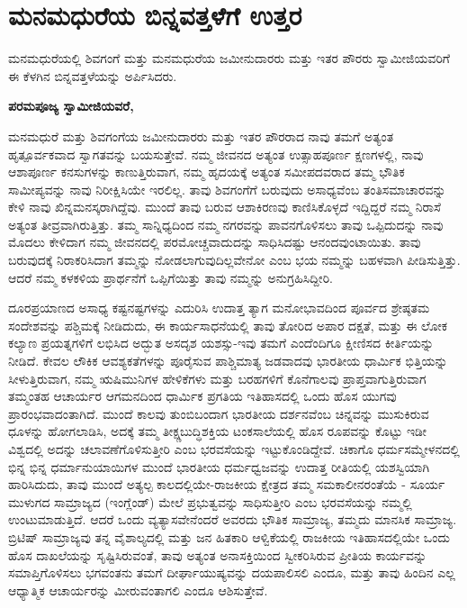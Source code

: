 
\chapter{ಮನಮಧುರೆಯ ಬಿನ್ನವತ್ತಳೆಗೆ ಉತ್ತರ}

ಮನಮಧುರೆಯಲ್ಲಿ ಶಿವಗಂಗೆ ಮತ್ತು ಮನಮಧುರೆಯ ಜಮೀನುದಾರರು ಮತ್ತು ಇತರ ಪೌರರು ಸ್ವಾಮೀಜಿಯವರಿಗೆ ಈ ಕೆಳಗಿನ ಬಿನ್ನವತ್ತಳೆಯನ್ನು ಅರ್ಪಿಸಿ\-ದರು.

\textbf{ಪರಮಪೂಜ್ಯ ಸ್ವಾಮೀಜಿಯವರೆ,}

ಮನಮಧುರೆ ಮತ್ತು ಶಿವಗಂಗೆಯ ಜಮೀನುದಾರರು ಮತ್ತು ಇತರ ಪೌರರಾದ ನಾವು ತಮಗೆ ಅತ್ಯಂತ ಹೃತ್ಪೂರ್ವಕವಾದ ಸ್ವಾಗತವನ್ನು ಬಯಸುತ್ತೇವೆ. ನಮ್ಮ ಜೀವನದ ಅತ್ಯಂತ ಉತ್ಸಾಹಪೂರ್ಣ ಕ್ಷಣಗಳಲ್ಲಿ, ನಾವು ಆಶಾಪೂರ್ಣ ಕನಸುಗಳನ್ನು ಕಾಣುತ್ತಿರುವಾಗ, ನಮ್ಮ ಹೃದಯಕ್ಕೆ ಅತ್ಯಂತ ಸಮೀಪದವರಾದ ತಮ್ಮ ಭೌತಿಕ ಸಾಮೀಪ್ಯವನ್ನು ನಾವು ನಿರೀಕ್ಷಿಸಿಯೇ ಇರಲಿಲ್ಲ. ತಾವು ಶಿವಗಂಗೆಗೆ ಬರುವುದು ಅಸಾಧ್ಯವೆಂಬ ತಂತಿಸಮಾಚಾರವನ್ನು ಕೇಳಿ ನಾವು ಖಿನ್ನಮನಸ್ಕರಾಗಿದ್ದೆವು. ಮುಂದೆ ತಾವು ಬರುವ ಆಶಾಕಿರಣವು ಕಾಣಿಸಿಕೊಳ್ಳದೆ ಇದ್ದಿದ್ದರೆ ನಮ್ಮ ನಿರಾಸೆ ಅತ್ಯಂತ ತೀವ್ರವಾಗಿರುತ್ತಿತ್ತು. ತಮ್ಮ ಸಾನ್ನಿಧ್ಯದಿಂದ ನಮ್ಮ ನಗರವನ್ನು ಪಾವನಗೊಳಿಸಲು ತಾವು ಒಪ್ಪಿದುದನ್ನು ನಾವು ಮೊದಲು ಕೇಳಿದಾಗ ನಮ್ಮ ಜೀವನದಲ್ಲಿ ಪರಮೋಚ್ಚವಾದುದನ್ನು ಸಾಧಿಸಿದಷ್ಟು ಆನಂದವುಂಟಾಯಿತು. ತಾವು ಬರುವುದಕ್ಕೆ ನಿರಾಕರಿಸಿದಾಗ ತಮ್ಮನ್ನು ನೋಡಲಾಗುವುದಿಲ್ಲವೇನೋ ಎಂಬ ಭಯ ನಮ್ಮನ್ನು ಬಹಳವಾಗಿ ಪೀಡಿಸುತ್ತಿತ್ತು. ಆದರೆ ನಮ್ಮ ಕಳಕಳಿಯ ಪ್ರಾರ್ಥನೆಗೆ ಒಪ್ಪಿಗೆಯಿತ್ತು ತಾವು ನಮ್ಮನ್ನು ಅನುಗ್ರಹಿಸಿದ್ದೀರಿ.

ದೂರಪ್ರಯಾಣದ ಅಸಾಧ್ಯ ಕಷ್ಟನಷ್ಟಗಳನ್ನು ಎದುರಿಸಿ ಉದಾತ್ತ ತ್ಯಾಗ ಮನೋಭಾವದಿಂದ ಪೂರ್ವದ ಶ್ರೇಷ್ಠತಮ ಸಂದೇಶವನ್ನು ಪಶ್ಚಿಮಕ್ಕೆ ನೀಡಿದುದು, ಈ ಕಾರ್ಯಸಾಧನೆಯಲ್ಲಿ ತಾವು ತೋರಿದ ಅಪಾರ ದಕ್ಷತೆ, ಮತ್ತು ಈ ಲೋಕ ಕಲ್ಯಾಣ ಪ್ರಯತ್ನಗಳಿಗೆ ಲಭಿಸಿದ ಅದ್ಭುತ ಅಸದೃಶ ಯಶಸ್ಸು-ಇವು ತಮಗೆ ಎಂದೆಂದಿಗೂ ಕ್ಷೀಣಿಸದ ಕೀರ್ತಿಯನ್ನು ನೀಡಿದೆ. ಕೇವಲ ಲೌಕಿಕ ಆವಶ್ಯ\-ಕತೆಗಳನ್ನು ಪೂರೈಸುವ ಪಾಶ್ಚಿಮಾತ್ಯ ಜಡವಾದವು ಭಾರತೀಯ ಧಾರ್ಮಿಕ ಭಿತ್ತಿಯನ್ನು ಸೀಳುತ್ತಿರುವಾಗ, ನಮ್ಮ ಋಷಿಮುನಿಗಳ ಹೇಳಿಕೆಗಳು ಮತ್ತು ಬರಹಗಳಿಗೆ ಕೊನೆಗಾಲವು ಪ್ರಾಪ್ತವಾಗುತ್ತಿರುವಾಗ ತಮ್ಮಂತಹ ಆಚಾರ್ಯರ ಆಗಮನದಿಂದ ಧಾರ್ಮಿಕ ಪ್ರಗತಿಯ ಇತಿಹಾಸದಲ್ಲಿ ಒಂದು ಹೊಸ ಯುಗವು ಪ್ರಾರಂಭವಾದಂತಾಗಿದೆ. ಮುಂದೆ ಕಾಲವು ತುಂಬಿಬಂದಾಗ ಭಾರತೀಯ ದರ್ಶನವೆಂಬ ಚಿನ್ನವನ್ನು ಮುಸುಕಿರುವ ಧೂಳನ್ನು ಹೋಗಲಾಡಿಸಿ, ಅದಕ್ಕೆ ತಮ್ಮ ತೀಕ್ಷ್ಣಬುದ್ಧಿಶಕ್ತಿಯ ಟಂಕಸಾಲೆಯಲ್ಲಿ ಹೊಸ ರೂಪವನ್ನು ಕೊಟ್ಟು ಇಡೀ ವಿಶ್ವದಲ್ಲಿ ಅದನ್ನು ಚಲಾವಣೆಗೊಳಿಸುತ್ತೀರಿ ಎಂಬ ಭರವಸೆಯನ್ನು ಇಟ್ಟುಕೊಂಡಿದ್ದೇವೆ. ಚಿಕಾಗೊ ಧರ್ಮಸಮ್ಮೇಳನದಲ್ಲಿ ಭಿನ್ನ ಭಿನ್ನ ಧರ್ಮಾನುಯಾಯಿಗಳ ಮುಂದೆ ಭಾರತೀಯ ಧರ್ಮಧ್ವಜವನ್ನು ಉದಾತ್ತ ರೀತಿಯಲ್ಲಿ ಯಶಸ್ವಿಯಾಗಿ ಹಾರಿಸಿದುದು, ತಾವು ಮುಂದೆ ಅತ್ಯಲ್ಪ ಕಾಲದಲ್ಲಿಯೇ-ರಾಜಕೀಯ ಕ್ಷೇತ್ರದ ತಮ್ಮ ಸಮಕಾಲೀನರಂತೆಯೆ - ಸೂರ್ಯ ಮುಳುಗದ ಸಾಮ್ರಾಜ್ಯದ (ಇಂಗ್ಲೆಂಡ್​) ಮೇಲೆ ಪ್ರಭುತ್ವವನ್ನು ಸಾಧಿಸುತ್ತೀರಿ ಎಂಬ ಭರವಸೆಯನ್ನು ನಮ್ಮಲ್ಲಿ ಉಂಟುಮಾಡುತ್ತಿದೆ. ಆದರೆ ಒಂದು ವ್ಯತ್ಯಾಸವೇನೆಂದರೆ ಅವರದು ಭೌತಿಕ ಸಾಮ್ರಾಜ್ಯ, ತಮ್ಮದು ಮಾನಸಿಕ ಸಾಮ್ರಾಜ್ಯ. ಬ್ರಿಟಿಷ್​ ಸಾಮ್ರಾಜ್ಯವು ತನ್ನ ವೈಶಾಲ್ಯದಲ್ಲಿ ಮತ್ತು ಜನ ಹಿತಕಾರಿ ಆಳ್ವಿಕೆಯಲ್ಲಿ ರಾಜಕೀಯ ಇತಿಹಾಸ\-ದಲ್ಲಿಯೇ ಒಂದು ಹೊಸ ದಾಖಲೆಯನ್ನು ಸೃಷ್ಟಿಸಿರುವಂತೆ, ತಾವು ಅತ್ಯಂತ ಅನಾಸಕ್ತಿಯಿಂದ ಸ್ವೀಕರಿಸಿರುವ ಪ್ರೀತಿಯ ಕಾರ್ಯವನ್ನು ಸಮಾಪ್ತಿಗೊಳಿಸಲು ಭಗವಂತನು ತಮಗೆ ದೀರ್ಘಾಯುಷ್ಯವನ್ನು ದಯಪಾಲಿಸಲಿ ಎಂದೂ, ಮತ್ತು ತಾವು ಹಿಂದಿನ ಎಲ್ಲ ಆಧ್ಯಾತ್ಮಿಕ ಆಚಾರ್ಯರನ್ನು ಮೀರುವಂತಾಗಲಿ ಎಂದೂ ಆಶಿಸುತ್ತೇವೆ.

